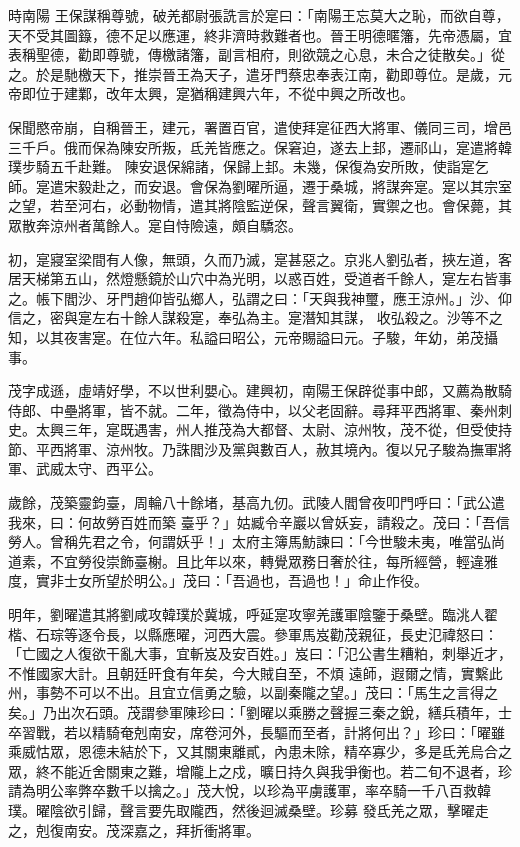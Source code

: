 \begin{pinyinscope}
 時南陽
 王保謀稱尊號，破羌都尉張詵言於寔曰：「南陽王忘莫大之恥，而欲自尊，天不受其圖籙，德不足以應運，終非濟時救難者也。晉王明德暱籓，先帝憑屬，宜表稱聖德，勸即尊號，傳檄諸籓，副言相府，則欲競之心息，未合之徒散矣。」從之。於是馳檄天下，推崇晉王為天子，遣牙門蔡忠奉表江南，勸即尊位。是歲，元帝即位于建鄴，改年太興，寔猶稱建興六年，不從中興之所改也。



 保聞愍帝崩，自稱晉王，建元，署置百官，遣使拜寔征西大將軍、儀同三司，增邑三千戶。俄而保為陳安所叛，氐羌皆應之。保窘迫，遂去上邽，遷祁山，寔遣將韓璞步騎五千赴難。
 陳安退保綿諸，保歸上邽。未幾，保復為安所敗，使詣寔乞師。寔遣宋毅赴之，而安退。會保為劉曜所逼，遷于桑城，將謀奔寔。寔以其宗室之望，若至河右，必動物情，遣其將陰監逆保，聲言翼衛，實禦之也。會保薨，其眾散奔涼州者萬餘人。寔自恃險遠，頗自驕恣。



 初，寔寢室梁間有人像，無頭，久而乃滅，寔甚惡之。京兆人劉弘者，挾左道，客居天梯第五山，然燈懸鏡於山穴中為光明，以惑百姓，受道者千餘人，寔左右皆事之。帳下閻沙、牙門趙仰皆弘鄉人，弘謂之曰：「天與我神璽，應王涼州。」沙、仰信之，密與寔左右十餘人謀殺寔，奉弘為主。寔潛知其謀，
 收弘殺之。沙等不之知，以其夜害寔。在位六年。私謚曰昭公，元帝賜謚曰元。子駿，年幼，弟茂攝事。



 茂字成遜，虛靖好學，不以世利嬰心。建興初，南陽王保辟從事中郎，又薦為散騎侍郎、中壘將軍，皆不就。二年，徵為侍中，以父老固辭。尋拜平西將軍、秦州刺史。太興三年，寔既遇害，州人推茂為大都督、太尉、涼州牧，茂不從，但受使持節、平西將軍、涼州牧。乃誅閻沙及黨與數百人，赦其境內。復以兄子駿為撫軍將軍、武威太守、西平公。



 歲餘，茂築靈鈞臺，周輪八十餘堵，基高九仞。武陵人閻曾夜叩門呼曰：「武公遣我來，曰：何故勞百姓而築
 臺乎？」姑臧令辛巖以曾妖妄，請殺之。茂曰：「吾信勞人。曾稱先君之令，何謂妖乎！」太府主簿馬魴諫曰：「今世駿未夷，唯當弘尚道素，不宜勞役崇飾臺榭。且比年以來，轉覺眾務日奢於往，每所經營，輕違雅度，實非士女所望於明公。」茂曰：「吾過也，吾過也！」命止作役。



 明年，劉曜遣其將劉咸攻韓璞於冀城，呼延寔攻寧羌護軍陰鑒于桑壁。臨洮人翟楷、石琮等逐令長，以縣應曜，河西大震。參軍馬岌勸茂親征，長史氾禕怒曰：「亡國之人復欲干亂大事，宜斬岌及安百姓。」岌曰：「氾公書生糟粕，刺舉近才，不惟國家大計。且朝廷旰食有年矣，今大賊自至，不煩
 遠師，遐爾之情，實繫此州，事勢不可以不出。且宜立信勇之驗，以副秦隴之望。」茂曰：「馬生之言得之矣。」乃出次石頭。茂謂參軍陳珍曰：「劉曜以乘勝之聲握三秦之銳，繕兵積年，士卒習戰，若以精騎奄剋南安，席卷河外，長驅而至者，計將何出？」珍曰：「曜雖乘威怙眾，恩德未結於下，又其關東離貳，內患未除，精卒寡少，多是氐羌烏合之眾，終不能近舍關東之難，增隴上之戍，曠日持久與我爭衡也。若二旬不退者，珍請為明公率弊卒數千以擒之。」茂大悅，以珍為平虜護軍，率卒騎一千八百救韓璞。曜陰欲引歸，聲言要先取隴西，然後迴滅桑壁。珍募
 發氐羌之眾，擊曜走之，剋復南安。茂深嘉之，拜折衝將軍。




\end{pinyinscope}
